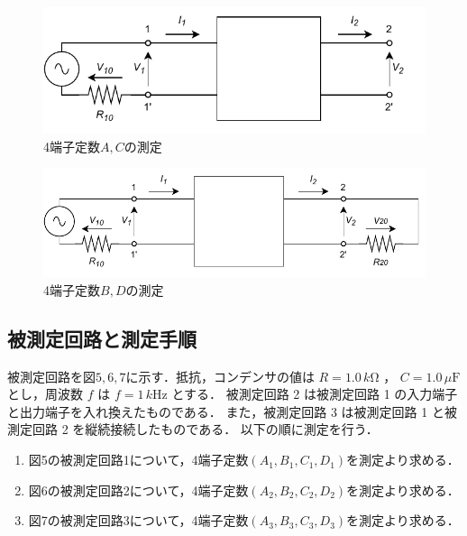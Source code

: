 \begin{figure}[H]
    \begin{center}
        \includegraphics[]{figure3.drawio.pdf}
        \caption{4端子定数$A,C$の測定}
    \end{center}
\end{figure}

\begin{figure}[H]
    \begin{center}
        \includegraphics[]{figure4.drawio.pdf}
        \caption{4端子定数$B,D$の測定}
    \end{center}
\end{figure}


\subsection{被測定回路と測定手順}
被測定回路を図$5,6,7$に示す．抵抗，コンデンサの値は $R=1.0\,\si{k\ohm}$ ， $C=1.0\,\si{\mu\farad}$ とし，周波数 $f$ は $f=1\,\si{k\hertz}$ とする．
被測定回路 2 は被測定回路 1 の入力端子と出力端子を入れ換えたものである．
また，被測定回路 3 は被測定回路 1 と被測定回路 2 を縦続接続したものである． 以下の順に測定を行う．

\begin{enumerate}
    \item 図5の被測定回路1について，4端子定数$(A_1, B_1, C_1, D_1)$を測定より求める．
    \item 図6の被測定回路2について，4端子定数$(A_2, B_2, C_2, D_2)$を測定より求める．
    \item 図7の被測定回路3について，4端子定数$(A_3, B_3, C_3, D_3)$を測定より求める．
\end{enumerate}

